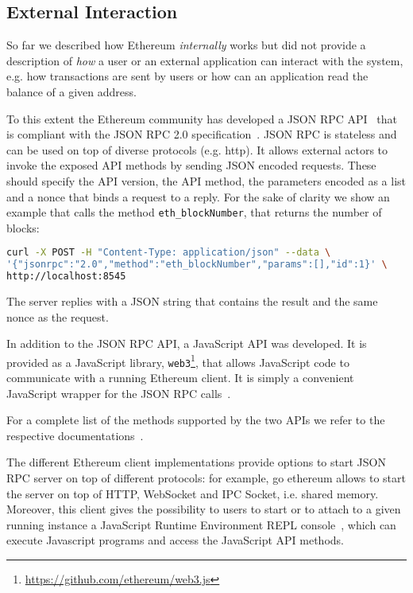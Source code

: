 \subsection{External Interaction}

So far we described how Ethereum \emph{internally} works but did not provide
a description of \emph{how} a user or an external application can interact with 
the system, e.g. how transactions are sent by users or how can an application
read the balance of a given address.

To this extent the Ethereum community has developed a JSON RPC
API~\cite{bib:json-rpc} that is compliant with the
JSON RPC 2.0 specification~\cite{bib:json2012json}.
JSON RPC is stateless and can be used on top of diverse protocols (e.g. http).
It allows external actors to invoke the exposed API methods by sending
JSON encoded requests. These should specify the
API version, the API method, the parameters encoded as a list and a nonce
that binds a request to a reply.
For the sake of clarity we show an example that calls the method 
\verb|eth_blockNumber|, that returns the number of blocks:

\begin{lstlisting}[language=bash]
curl -X POST -H "Content-Type: application/json" --data \
'{"jsonrpc":"2.0","method":"eth_blockNumber","params":[],"id":1}' \
http://localhost:8545
\end{lstlisting} 
The server replies with a JSON string that contains the result and the same
nonce as the request.




In addition to the JSON RPC API, a JavaScript API was developed. It is provided
as a JavaScript library, 
\texttt{web3}\footnote{\url{https://github.com/ethereum/web3.js}}, that allows
JavaScript code to
communicate with a running Ethereum client. It is simply a convenient
JavaScript wrapper for the JSON RPC calls~\cite{bib:javascript-api}.


For a complete list of the methods supported by the two APIs we refer to the
respective documentations~\cite{bib:json-rpc, bib:javascript-api}.

The different Ethereum client implementations provide options to start 
JSON RPC server on top of different protocols: 
for example, go ethereum allows to start
the server on top of HTTP, WebSocket and IPC Socket, i.e. shared memory.
Moreover, this client gives the possibility to users to start or to attach to a 
given running instance a 
JavaScript Runtime Environment REPL console~\cite{bib:js-console}, which 
can execute Javascript programs and access the JavaScript API methods.

